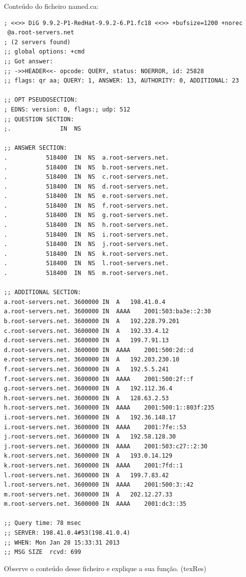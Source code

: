 Conteúdo do ficheiro \textsf{named.ca}:

\begin{verbatim}
; <<>> DiG 9.9.2-P1-RedHat-9.9.2-6.P1.fc18 <<>> +bufsize=1200 +norec
 @a.root-servers.net
; (2 servers found)
;; global options: +cmd
;; Got answer:
;; ->>HEADER<<- opcode: QUERY, status: NOERROR, id: 25828
;; flags: qr aa; QUERY: 1, ANSWER: 13, AUTHORITY: 0, ADDITIONAL: 23

;; OPT PSEUDOSECTION:
; EDNS: version: 0, flags:; udp: 512
;; QUESTION SECTION:
;.				IN	NS

;; ANSWER SECTION:
.			518400	IN	NS	a.root-servers.net.
.			518400	IN	NS	b.root-servers.net.
.			518400	IN	NS	c.root-servers.net.
.			518400	IN	NS	d.root-servers.net.
.			518400	IN	NS	e.root-servers.net.
.			518400	IN	NS	f.root-servers.net.
.			518400	IN	NS	g.root-servers.net.
.			518400	IN	NS	h.root-servers.net.
.			518400	IN	NS	i.root-servers.net.
.			518400	IN	NS	j.root-servers.net.
.			518400	IN	NS	k.root-servers.net.
.			518400	IN	NS	l.root-servers.net.
.			518400	IN	NS	m.root-servers.net.

;; ADDITIONAL SECTION:
a.root-servers.net.	3600000	IN	A	198.41.0.4
a.root-servers.net.	3600000	IN	AAAA	2001:503:ba3e::2:30
b.root-servers.net.	3600000	IN	A	192.228.79.201
c.root-servers.net.	3600000	IN	A	192.33.4.12
d.root-servers.net.	3600000	IN	A	199.7.91.13
d.root-servers.net.	3600000	IN	AAAA	2001:500:2d::d
e.root-servers.net.	3600000	IN	A	192.203.230.10
f.root-servers.net.	3600000	IN	A	192.5.5.241
f.root-servers.net.	3600000	IN	AAAA	2001:500:2f::f
g.root-servers.net.	3600000	IN	A	192.112.36.4
h.root-servers.net.	3600000	IN	A	128.63.2.53
h.root-servers.net.	3600000	IN	AAAA	2001:500:1::803f:235
i.root-servers.net.	3600000	IN	A	192.36.148.17
i.root-servers.net.	3600000	IN	AAAA	2001:7fe::53
j.root-servers.net.	3600000	IN	A	192.58.128.30
j.root-servers.net.	3600000	IN	AAAA	2001:503:c27::2:30
k.root-servers.net.	3600000	IN	A	193.0.14.129
k.root-servers.net.	3600000	IN	AAAA	2001:7fd::1
l.root-servers.net.	3600000	IN	A	199.7.83.42
l.root-servers.net.	3600000	IN	AAAA	2001:500:3::42
m.root-servers.net.	3600000	IN	A	202.12.27.33
m.root-servers.net.	3600000	IN	AAAA	2001:dc3::35

;; Query time: 78 msec
;; SERVER: 198.41.0.4#53(198.41.0.4)
;; WHEN: Mon Jan 28 15:33:31 2013
;; MSG SIZE  rcvd: 699
\end{verbatim}

Observe o conteúdo desse ficheiro e explique a sua função. (texRes)


